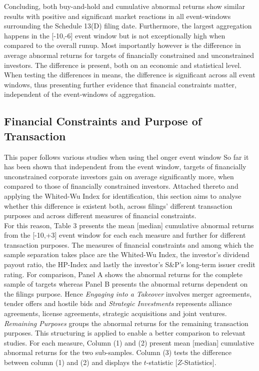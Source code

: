\documentclass[12pt]{article}
\begin{document}
Concluding, both buy-and-hold and cumulative abnormal returns show similar results with positive and significant market reactions in all event-windows surrounding the Schedule 13(D) filing date. Furthermore, the largest aggregation happens in the [-10,-6] event window but is not exceptionally high when compared to the overall runup. Most importantly however is the difference in average abnormal returns for targets of financially constrained and unconstrained investors. The difference is present, both on an economic and statistical level. When testing the differences in means, the difference is significant across all event windows, thus presenting further evidence that financial constraints matter, independent of the event-windows of aggregation.

\subsection{Financial Constraints and Purpose of Transaction}
This paper follows various studies when using thel onger event window
So far it has been shown that independent from the event window, targets of financially unconstrained corporate investors gain on average significantly more, when compared to those of financially constrained investors. Attached thereto and applying the Whited-Wu Index for identification, this section aims to analyse whether this difference is existent both, across filings' different transaction purposes and across different measures of financial constraints.\\
For this reason, Table 3 presents the mean [median] cumulative abnormal returns from the [-10,+3] event window for each each measure and further for different transaction purposes. The measures of financial constraints and among which the sample separation takes place are the Whited-Wu Index, the investor's dividend payout ratio, the HP-Index and lastly the investor's S\&P's long-term issuer credit rating. For comparison, Panel A shows the abnormal returns for the complete sample of targets whereas Panel B presents the abnormal returns dependent on the filings purpose. Hence \emph{Engaging into a Takeover} involves merger agreements, tender offers and hostile bids and \emph{Strategic Investments} represents alliance agreements, license agreements, strategic acquisitions and joint ventures. \emph{Remaining Purposes} groups the abnormal returns for the remaining transaction purposes. This structuring is applied to enable a better comparison to relevant studies. For each measure, Column (1) and (2) present mean [median] cumulative abnormal returns for the two sub-samples. Column (3) tests the difference between column (1) and (2) and displays the  $t$-statistic [$Z$-Statistics].
\end{document}
